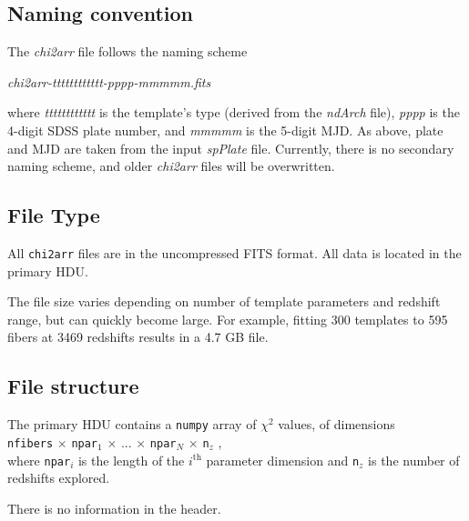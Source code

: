 \documentclass[12pt]{article}
\begin{document}
\subsection{Naming convention}

The \textit{chi2arr} file follows the naming scheme

\begin{center}
	\textit{chi2arr-tttttttttttt-pppp-mmmmm.fits}
\end{center}

where \textit{tttttttttttt} is the template's type (derived from the \textit{ndArch} file),
\textit{pppp} is the 4-digit SDSS plate number, and \textit{mmmmm} is the 5-digit
MJD.  As above, plate and MJD are taken from the input \textit{spPlate} file.
Currently, there is no secondary naming scheme, and older \textit{chi2arr} files
will be overwritten.

\subsection{File Type}

All \texttt{chi2arr} files are in the uncompressed FITS format.  All data is located in the
primary HDU.

The file size varies depending on number of template parameters and redshift range,
but can quickly become large.  For example, fitting 300 templates to 595 fibers at
3469 redshifts results in a 4.7 GB file.

\subsection{File structure}

The primary HDU contains a \texttt{numpy} array of $\chi^2$ values, of dimensions \\
\texttt{nfibers} $\times$
\texttt{npar$_1$} $\times$ ... $\times$ \texttt{npar$_N$} $\times$ \texttt{n$_z$} ,\\
where \texttt{npar$_i$} is the length of the $i^{\mathrm{th}}$ parameter dimension
and \texttt{n$_z$} is the number of redshifts explored.

There is no information in the header.
\end{document}
